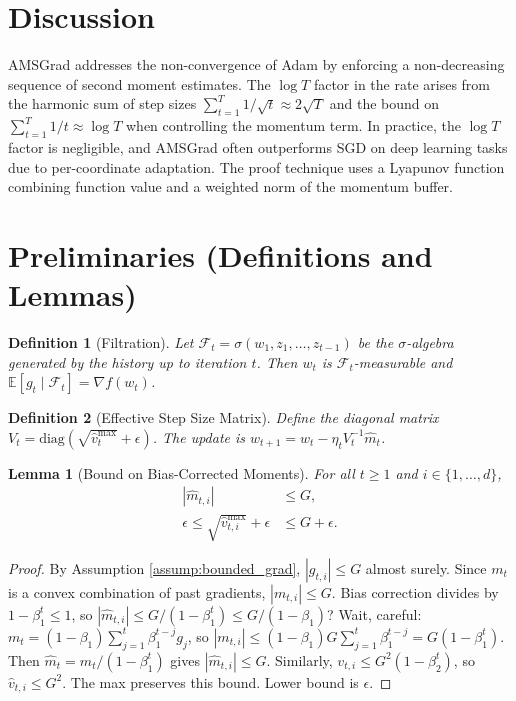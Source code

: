 \documentclass{article}
\newtheorem{lemma}{Lemma}
\newtheorem{definition}{Definition}
\begin{document}
\section*{Discussion}

AMSGrad addresses the non-convergence of Adam by enforcing a non-decreasing sequence of second moment estimates. The $\log T$ factor in the rate arises from the harmonic sum of step sizes $\sum_{t=1}^T 1/\sqrt{t} \approx 2\sqrt{T}$ and the bound on $\sum_{t=1}^T 1/t \approx \log T$ when controlling the momentum term. In practice, the $\log T$ factor is negligible, and AMSGrad often outperforms SGD on deep learning tasks due to per-coordinate adaptation. The proof technique uses a Lyapunov function combining function value and a weighted norm of the momentum buffer.

\section*{Preliminaries (Definitions and Lemmas)}

\begin{definition}[Filtration]
Let $\mathcal{F}_t = \sigma(w_1, z_1, \dots, z_{t-1})$ be the $\sigma$-algebra generated by the history up to iteration $t$. Then $w_t$ is $\mathcal{F}_t$-measurable and $\mathbb{E}[g_t \mid \mathcal{F}_t] = \nabla f(w_t)$.
\end{definition}

\begin{definition}[Effective Step Size Matrix]
Define the diagonal matrix $V_t = \text{diag}(\sqrt{\hat{v}_t^{\text{max}}} + \epsilon)$. The update is $w_{t+1} = w_t - \eta_t V_t^{-1} \hat{m}_t$.
\end{definition}

\begin{lemma}[Bound on Bias-Corrected Moments] \label{lem:moment_bounds}
For all $t \ge 1$ and $i \in \{1,\dots,d\}$,
\begin{align}
    |\hat{m}_{t,i}| &\le G, \label{eq:m_bound} \\
    \epsilon \le \sqrt{\hat{v}_{t,i}^{\text{max}}} + \epsilon &\le G + \epsilon. \label{eq:v_bound}
\end{align}
\end{lemma}
\begin{proof}
By Assumption \ref{assump:bounded_grad}, $|g_{t,i}| \le G$ almost surely. Since $m_t$ is a convex combination of past gradients, $|m_{t,i}| \le G$. Bias correction divides by $1-\beta_1^t \le 1$, so $|\hat{m}_{t,i}| \le G / (1-\beta_1^t) \le G/(1-\beta_1)$? Wait, careful: $m_t = (1-\beta_1)\sum_{j=1}^t \beta_1^{t-j} g_j$, so $|m_{t,i}| \le (1-\beta_1) G \sum_{j=1}^t \beta_1^{t-j} = G(1-\beta_1^t)$. Then $\hat{m}_t = m_t/(1-\beta_1^t)$ gives $|\hat{m}_{t,i}| \le G$. Similarly, $v_{t,i} \le G^2(1-\beta_2^t)$, so $\hat{v}_{t,i} \le G^2$. The max preserves this bound. Lower bound is $\epsilon$.
\end{proof}
\end{document}
